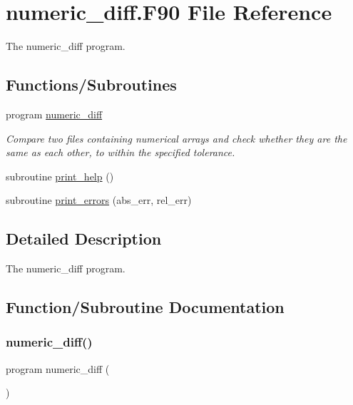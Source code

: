 \hypertarget{numeric__diff_8_f90}{}\section{numeric\+\_\+diff.\+F90 File Reference}
\label{numeric__diff_8_f90}


The numeric\+\_\+diff program.  


\subsection*{Functions/\+Subroutines}
\begin{DoxyCompactItemize}
\item 
program \mbox{\hyperlink{numeric__diff_8_f90_a6ec48644e735467f8b0d45696a8895d1}{numeric\+\_\+diff}}
\begin{DoxyCompactList}\small\item\em Compare two files containing numerical arrays and check whether they are the same as each other, to within the specified tolerance. \end{DoxyCompactList}\item 
subroutine \mbox{\hyperlink{numeric__diff_8_f90_a4e8958efa57e8d49a84f42e0795c84c5}{print\+\_\+help}} ()
\item 
subroutine \mbox{\hyperlink{numeric__diff_8_f90_a1a449c75c493556b84502ebd0de7cb65}{print\+\_\+errors}} (abs\+\_\+err, rel\+\_\+err)
\end{DoxyCompactItemize}


\subsection{Detailed Description}
The numeric\+\_\+diff program. 



\subsection{Function/\+Subroutine Documentation}
\mbox{\label{numeric__diff_8_f90_a6ec48644e735467f8b0d45696a8895d1}} 
\subsubsection{\texorpdfstring{numeric\+\_\+diff()}{numeric\_diff()}}
{\footnotesize\ttfamily program numeric\+\_\+diff (\begin{DoxyParamCaption}{ }\end{DoxyParamCaption})}



